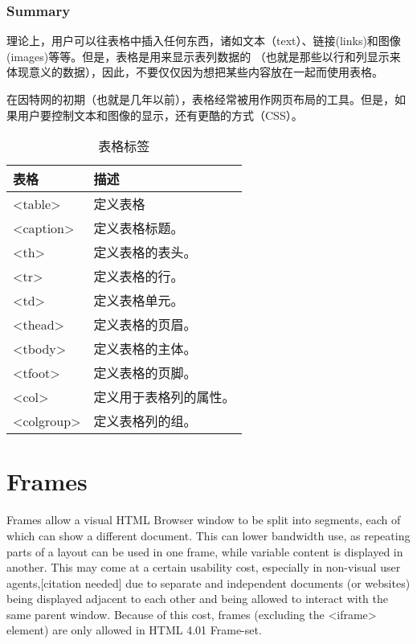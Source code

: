 \subsection{Summary}

理论上，用户可以往表格中插入任何东西，诸如文本（text）、链接(links)和图像(images)等等。但是，表格是用来显示表列数据的 （也就是那些以行和列显示来体现意义的数据），因此，不要仅仅因为想把某些内容放在一起而使用表格。

在因特网的初期（也就是几年以前），表格经常被用作网页布局的工具。但是，如果用户要控制文本和图像的显示，还有更酷的方式（CSS）。

\begin{table}[!h]
\centering
\caption{表格标签}
\begin{tabular}{|l|l|}
\hline
表格			&描述				\\
\hline
<table>		&定义表格			\\
\hline
<caption>		&定义表格标题。		\\
\hline
<th>			&定义表格的表头。\\
\hline
<tr>			&定义表格的行。	\\
\hline
<td>			&定义表格单元。	\\
\hline
<thead>		&定义表格的页眉。\\
\hline
<tbody>		&定义表格的主体。\\
\hline
<tfoot>		&定义表格的页脚。\\
\hline
<col>		&定义用于表格列的属性。	\\
\hline
<colgroup>	&定义表格列的组。	\\
\hline
\end{tabular}
\end{table}

\chapter{Frames}

Frames allow a visual HTML Browser window to be split into segments, each of which can show a different document. This can lower bandwidth use, as repeating parts of a layout can be used in one frame, while variable content is displayed in another. This may come at a certain usability cost, especially in non-visual user agents,[citation needed] due to separate and independent documents (or websites) being displayed adjacent to each other and being allowed to interact with the same parent window. Because of this cost, frames (excluding the <iframe> element) are only allowed in HTML 4.01 Frame-set.

